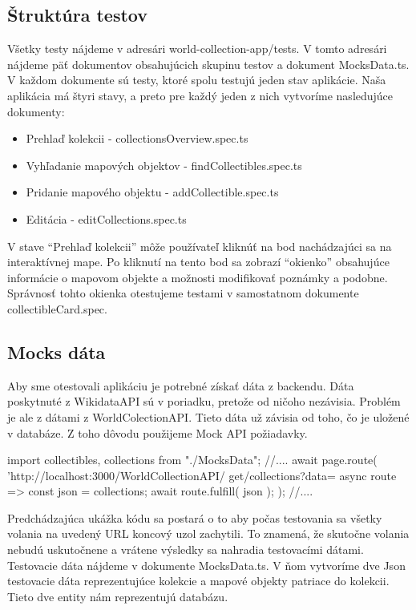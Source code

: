 \subsection*{Štruktúra testov }
Všetky testy nájdeme v adresári world-collection-app/tests. V tomto adresári nájdeme päť dokumentov obsahujúcich skupinu testov a dokument MocksData.ts. 
V každom dokumente sú testy, ktoré spolu testujú jeden stav aplikácie. Naša aplikácia má štyri stavy, a preto pre každý jeden z nich vytvoríme nasledujúce dokumenty: 
\begin{itemize}
      \item Prehlaď kolekcii - collectionsOverview.spec.ts
      \item Vyhľadanie mapových objektov - findCollectibles.spec.ts
      \item Pridanie mapového objektu - addCollectible.spec.ts 
      \item Editácia - editCollections.spec.ts
\end{itemize}

V stave “Prehlaď kolekcii” môže používateľ kliknúť na bod nachádzajúci sa na interaktívnej mape. Po kliknutí na tento bod sa zobrazí “okienko” obsahujúce informácie o mapovom objekte a možnosti modifikovať poznámky a podobne. 
Správnosť tohto okienka otestujeme testami v samostatnom dokumente collectibleCard.spec. 

\subsection*{Mocks dáta}
Aby sme otestovali aplikáciu je potrebné získať dáta z backendu. Dáta poskytnuté z WikidataAPI sú v poriadku, pretože od ničoho nezávisia. Problém je ale z dátami z WorldColectionAPI. 
Tieto dáta už závisia od toho, čo je uložené v databáze. Z toho dôvodu použijeme Mock API požiadavky. 

\begin{code}
import { collectibles, collections } from "./MocksData";
//....
await page.route(
      'http://localhost:3000/WorldCollectionAPI/
      get/collections?data=%
      async route => {
      const json = collections;
      await route.fulfill({ json });
      }
);
//....
\end{code}
Predchádzajúca ukážka kódu sa postará o to aby počas testovania sa všetky volania na uvedený URL koncový uzol zachytili. To znamená, že skutočne volania nebudú uskutočnene  
a vrátene výsledky sa nahradia testovacími dátami.  
Testovacie dáta nájdeme v dokumente MocksData.ts. V ňom vytvoríme dve Json testovacie dáta reprezentujúce kolekcie a mapové objekty patriace do kolekcii. Tieto dve entity nám reprezentujú databázu. 

